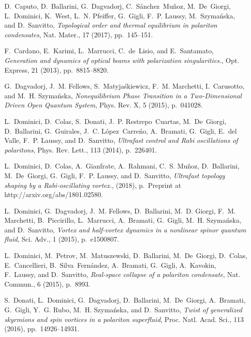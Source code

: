 \documentclass[aps,prb,twocolumn,superscriptaddress,nofootinbib]{revtex4}
\begin{document}
\begin{thebibliography}{10}
{\sc D.~Caputo, D.~Ballarini, G.~Dagvadorj, C.~S\'{a}nchez Mu\~{n}oz,
  M.~De Giorgi, L.~Dominici, K.~West, L.~N. Pfeiffer, G.~Gigli, F.~P. Laussy,
  M.~Szyma\'{n}ska, and D.~Sanvitto}, {\em Topological order and thermal
  equilibrium in polariton condensates}, Nat. Mater., 17 (2017), pp.~145--151.

{\sc F.~Cardano, E.~Karimi, L.~Marrucci, C.~de~Lisio, and E.~Santamato}, {\em
  {Generation and dynamics of optical beams with polarization singularities.}},
  Opt. Express, 21 (2013), pp.~8815--8820.

{\sc G.~Dagvadorj, J.~M. Fellows, S.~Matyja\'{s}kiewicz, F.~M. Marchetti,
  I.~Carusotto, and M.~H. Szyma\'{n}ska}, {\em Nonequilibrium {Phase}
  {Transition} in a {Two}-{Dimensional} {Driven} {Open} {Quantum} {System}},
  Phys. Rev. X, 5 (2015), p.~041028.

{\sc L.~Dominici, D.~Colas, S.~Donati, J.~P. Restrepo~Cuartas, M.~De~Giorgi,
  D.~Ballarini, G.~Guirales, J.~C. L\'{o}pez~Carre\'{n}o, A.~Bramati, G.~Gigli,
  E.~del Valle, F.~P. Laussy, and D.~Sanvitto}, {\em Ultrafast control and
  {Rabi} oscillations of polaritons}, Phys. Rev. Lett., 113 (2014), p.~226401.

{\sc L.~Dominici, D.~Colas, A.~Gianfrate, A.~Rahmani, C.~S. Muñoz,
  D.~Ballarini, M.~De~Giorgi, G.~Gigli, F.~P. Laussy, and D.~Sanvitto}, {\em
  Ultrafast topology shaping by a {Rabi}-oscillating vortex.},  (2018),
  p.~Preprint at http://arxiv.org/abs/1801.02580.

{\sc L.~Dominici, G.~Dagvadorj, J.~M. Fellows, D.~Ballarini, M.~D. Giorgi,
  F.~M. Marchetti, B.~Piccirillo, L.~Marrucci, A.~Bramati, G.~Gigli, M.~H.
  Szyma{\'n}ska, and D.~Sanvitto}, {\em Vortex and half-vortex dynamics in a
  nonlinear spinor quantum fluid}, Sci. Adv., 1 (2015), p.~e1500807.

{\sc L.~Dominici, M.~Petrov, M.~Matuszewski, D.~Ballarini, M.~De~Giorgi,
  D.~Colas, E.~Cancellieri, B.~Silva~Fern\'{a}ndez, A.~Bramati, G.~Gigli,
  A.~Kavokin, F.~Laussy, and D.~Sanvitto}, {\em Real-space collapse of a
  polariton condensate}, Nat. Commun., 6 (2015), p.~8993.

{\sc S.~Donati, L.~Dominici, G.~Dagvadorj, D.~Ballarini, M.~De~Giorgi,
  A.~Bramati, G.~Gigli, Y.~G. Rubo, M.~H. Szyma\'{n}ska, and D.~Sanvitto}, {\em
  Twist of generalized skyrmions and spin vortices in a polariton superfluid},
  Proc. Natl. Acad. Sci., 113 (2016), pp.~14926--14931.


\end{thebibliography}
\end{document}
